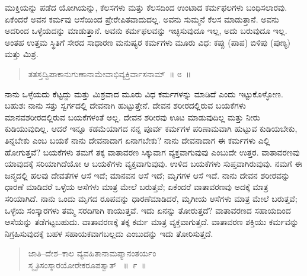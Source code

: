 

ಮುಕ್ತಿಯನ್ನು ಪಡೆದ ಯೋಗಿಯನ್ನು, ಕೆಲಸಗಳು ಮತ್ತು ಕೆಲಸದಿಂದ ಉಂಟಾದ ಕರ್ಮಫಲಗಳು ಬಂಧಿಸಲಾರವು. ಏಕೆಂದರೆ ಅವನ ಕರ್ಮವು ಆಸೆಯಿಂದ ಪ್ರೇರೇಪಿತವಾದುದಲ್ಲ. ಅವನು ಸುಮ್ಮನೆ ಕೆಲಸ ಮಾಡುತ್ತಾನೆ. ಅವನು ಅದರಿಂದ ಒಳ್ಳೆಯದನ್ನು ಮಾಡುತ್ತಾನೆ. ಅವನು ಕರ್ಮಫಲವನ್ನು ಇಚ್ಛಿಸುವುದೂ ಇಲ್ಲ, ಅದು ಬರುವುದೂ ಇಲ್ಲ. ಅಂತಹ ಉತ್ತಮ ಸ್ಥಿತಿಗೆ ಸೇರದ ಸಾಧಾರಣ ಮನುಷ್ಯರ ಕರ್ಮಗಳು ಮೂರು ವಿಧ: ಕಪ್ಪು (ಪಾಪ) ಬಿಳಿಪು (ಪುಣ್ಯ) ಮತ್ತು ಮಿಶ್ರ. 

\vspace{-0.3cm}

\begin{verse}
ತತಸ್ತದ್ವಿಪಾಕಾನುಗುಣಾನಾಮೇವಾಭಿವ್ಯಕ್ತಿರ್ವಾಸನಾಮ್​~॥ ೮~॥
\end{verse}

\vspace{-0.3cm}


ನಾನು ಒಳ್ಳೆಯದು ಕೆಟ್ಟದ್ದು ಮತ್ತು ಮಿಶ್ರವಾದ ಮೂರು ವಿಧ ಕರ್ಮಗಳನ್ನು ಮಾಡಿದೆ ಎಂದು ಇಟ್ಟುಕೊಳ್ಳೋಣ. ಬಹುಶಃ ನಾನು ಸತ್ತು ಸ್ವರ್ಗದಲ್ಲಿ ದೇವನಾಗಿ ಹುಟ್ಟುತ್ತೇನೆ. ದೇವನ ಶರೀರದಲ್ಲಿರುವ ಬಯಕೆಗಳು ಮಾನವಶರೀರದಲ್ಲಿರುವ ಬಯಕೆಗಳಂತೆ ಅಲ್ಲ. ದೇವನ ಶರೀರವು ಊಟ ಮಾಡುವುದಿಲ್ಲ ಮತ್ತು ನೀರು ಕುಡಿಯುವುದಿಲ್ಲ. ಆದರೆ ಇನ್ನೂ ಕಡಮೆಯಾಗದ ನನ್ನ ಪೂರ್ವ ಕರ್ಮಗಳ ಪರಿಣಾಮವಾಗಿ ಹುಟ್ಟುವ ಕುಡಿಯಬೇಕು, ತಿನ್ನಬೇಕು ಎಂಬ ಬಯಕೆ ನಾನು ದೇವನಾದಾಗ ಏನಾಗಬೇಕು? ನಾನು ದೇವನಾದಾಗ ಈ ಕರ್ಮಗಳು ಎಲ್ಲಿ ಹೋಗುತ್ತವೆ? ಬಯಕೆಗಳು ತಮಗೆ ತಕ್ಕ ವಾತಾವರಣ ಸಿಕ್ಕುವಾಗ ವ್ಯಕ್ತವಾಗುವುವು ಎಂಬುದೇ ಉತ್ತರ. ವಾತಾವರಣವು ಯಾವುದಕ್ಕೆ ಸರಿಯಾಗಿದೆಯೋ ಆ ಬಯಕೆಗಳು ವ್ಯಕ್ತವಾಗುವುವು. ಉಳಿದ ಬಯಕೆಗಳು ಸುಪ್ತವಾಗಿರುವುವು. ನಮಗೆ ಈ ಜನ್ಮದಲ್ಲಿ ಹಲವು ದೇವತೆಗಳ ಆಸೆ ಇದೆ; ಮಾನವನ ಆಸೆ ಇದೆ; ಮೃಗಗಳ ಆಸೆ ಇದೆ. ನಾನು ದೇವನ ಶರೀರವನ್ನು ಧಾರಣೆ ಮಾಡಿದರೆ ಒಳ್ಳೆಯ ಆಸೆಗಳು ಮಾತ್ರ ಮೇಲೆ ಬರುತ್ತವೆ; ಏಕೆಂದರೆ ವಾತಾವರಣವು ಅದಕ್ಕೆ ಮಾತ್ರ ಸರಿಯಾಗಿದೆ. ನಾನು ಒಂದು ಮೃಗದ ರೂಪವನ್ನು ಧಾರಣೆಮಾಡಿದರೆ, ಮೃಗೀಯ ಆಸೆಗಳು ಮಾತ್ರ ಮೇಲೆ ಬರುತ್ತವೆ; ಒಳ್ಳೆಯ ಸಂಸ್ಕಾರಗಳು ತಮ್ಮ ಸರದಿಗಾಗಿ ಕಾಯುತ್ತವೆ. ಇದು ಏನನ್ನು ತೋರುತ್ತದೆ? ವಾತಾವರಣದ ಸಹಾಯದಿಂದ ಆಸೆಯನ್ನು ತಡೆಗಟ್ಟಬಹುದು. ವಾತಾವರಣಕ್ಕೆ ತಕ್ಕ ಕರ್ಮ ಮಾತ್ರ ವ್ಯಕ್ತವಾಗುತ್ತದೆ. ವಾತಾವರಣ ಶಕ್ತಿಯು ಕರ್ಮವನ್ನು ನಿಗ್ರಹಿಸುವುದಕ್ಕೆ ಬಹಳ ಸಹಾಯಕವಾಗಬಲ್ಲದು ಎಂಬುದನ್ನು ಇದು ತೋರಿಸುತ್ತದೆ. 

\vspace{-0.3cm}

\begin{verse}
ಜಾತಿ–ದೇಶ–ಕಾಲ ವ್ಯವಹಿತಾನಾಮಪ್ಯಾನಂತರ್ಯಂ\\ ಸ್ಮೃತಿಸಂಸ್ಕಾರಯೋರೇಕರೂಪತ್ವಾತ್​~ \hfill{॥~೯~॥}
\end{verse}

